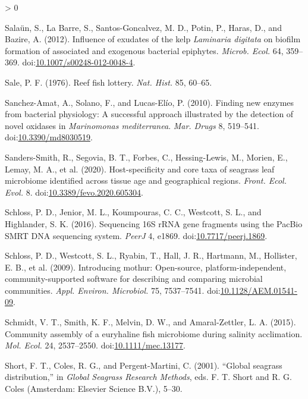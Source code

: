 \documentclass[
  12pt,
]{article}
\newlength{\cslhangindent}
\newenvironment{CSLReferences}[2] %
 {%
  \setlength{\parindent}{0pt}
  \ifodd #1 \everypar{\setlength{\hangindent}{\cslhangindent}}\ignorespaces\fi
  \ifnum #2 > 0
  \setlength{\parskip}{#2\baselineskip}
  \fi
 }%
 {}
\begin{document}
\begin{CSLReferences}{1}{0}
\leavevmode\hypertarget{ref-Salaun2012}{}%
Salaün, S., La Barre, S., Santos-Goncalvez, M. D., Potin, P., Haras, D.,
and Bazire, A. (2012). Influence of exudates of the kelp
{\emph{Laminaria digitata}} on biofilm formation of associated and
exogenous bacterial epiphytes. \emph{Microb. Ecol.} 64, 359--369.
doi:\href{https://doi.org/10.1007/s00248-012-0048-4}{10.1007/s00248-012-0048-4}.

\leavevmode\hypertarget{ref-Sale1976}{}%
Sale, P. F. (1976). Reef fish lottery. \emph{Nat. Hist.} 85, 60--65.

\leavevmode\hypertarget{ref-Sanchez-Amat2010}{}%
Sanchez-Amat, A., Solano, F., and Lucas-Elío, P. (2010). Finding new
enzymes from bacterial physiology: A successful approach illustrated by
the detection of novel oxidases in {\emph{Marinomonas mediterranea}}.
\emph{Mar. Drugs} 8, 519--541.
doi:\href{https://doi.org/10.3390/md8030519}{10.3390/md8030519}.

\leavevmode\hypertarget{ref-Sanders-Smith2020}{}%
Sanders-Smith, R., Segovia, B. T., Forbes, C., Hessing-Lewis, M.,
Morien, E., Lemay, M. A., et al. (2020). Host-specificity and core taxa
of seagrass leaf microbiome identified across tissue age and
geographical regions. \emph{Front. Ecol. Evol.} 8.
doi:\href{https://doi.org/10.3389/fevo.2020.605304}{10.3389/fevo.2020.605304}.

\leavevmode\hypertarget{ref-Schloss2016}{}%
Schloss, P. D., Jenior, M. L., Koumpouras, C. C., Westcott, S. L., and
Highlander, S. K. (2016). Sequencing {16S rRNA} gene fragments using the
{PacBio SMRT DNA} sequencing system. \emph{PeerJ} 4, e1869.
doi:\href{https://doi.org/10.7717/peerj.1869}{10.7717/peerj.1869}.

\leavevmode\hypertarget{ref-Schloss2009}{}%
Schloss, P. D., Westcott, S. L., Ryabin, T., Hall, J. R., Hartmann, M.,
Hollister, E. B., et al. (2009). Introducing mothur: Open-source,
platform-independent, community-supported software for describing and
comparing microbial communities. \emph{Appl. Environ. Microbiol.} 75,
7537--7541.
doi:\href{https://doi.org/10.1128/AEM.01541-09}{10.1128/AEM.01541-09}.

\leavevmode\hypertarget{ref-Schmidt2015a}{}%
Schmidt, V. T., Smith, K. F., Melvin, D. W., and Amaral-Zettler, L. A.
(2015). Community assembly of a euryhaline fish microbiome during
salinity acclimation. \emph{Mol. Ecol.} 24, 2537--2550.
doi:\href{https://doi.org/10.1111/mec.13177}{10.1111/mec.13177}.

\leavevmode\hypertarget{ref-Short2001}{}%
Short, F. T., Coles, R. G., and Pergent-Martini, C. (2001). {``Global
seagrass distribution,''} in \emph{Global {Seagrass Research Methods}},
eds. F. T. Short and R. G. Coles ({Amsterdam}: {Elsevier Science B.V.}),
5--30.


\end{CSLReferences}
\end{document}
